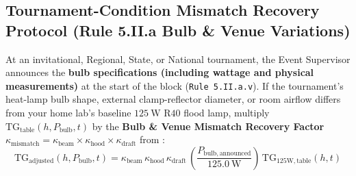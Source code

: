 \subsection{Tournament-Condition Mismatch Recovery Protocol (Rule 5.II.a Bulb \& Venue Variations)}
At an invitational, Regional, State, or National tournament, the Event Supervisor announces the \textbf{bulb specifications (including wattage and physical measurements)} at the start of the block (\texttt{Rule 5.II.a.v}). If the tournament's heat-lamp bulb shape, external clamp-reflector diameter, or room airflow differs from your home lab's baseline $\SI{125}{\watt}$ $\mathrm{R40}$ flood lamp, multiply $\mathrm{TG}_{\mathrm{table}}(h, P_{\mathrm{bulb}}, t)$ by the \textbf{Bulb \& Venue Mismatch Recovery Factor $\kappa_{\mathrm{mismatch}} = \kappa_{\mathrm{beam}}\times\kappa_{\mathrm{hood}}\times\kappa_{\mathrm{draft}}$} from :
\begin{equation}\label{eq:16:mismatch-recovery}
  \boxed{\mathrm{TG}_{\mathrm{adjusted}}(h, P_{\mathrm{bulb}}, t) = \kappa_{\mathrm{beam}}\,\kappa_{\mathrm{hood}}\,\kappa_{\mathrm{draft}}\,\left(\frac{P_{\mathrm{bulb,announced}}}{\SI{125.0}{\watt}}\right)\,\mathrm{TG}_{125\mathrm{W,table}}(h, t)}
\end{equation}

